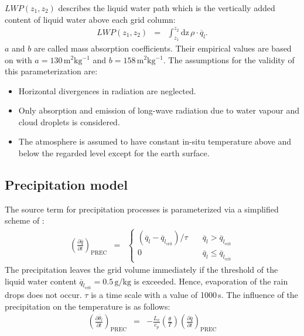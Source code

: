 \documentclass[11pt,a4paper]{scrartcl}
\begin{document}
$LWP(z_{1},z_{2})$ describes the liquid water path which is the vertically added content of liquid water above each grid column: 
\begin{eqnarray}
 LWP(z_{1},z_{2}) & = & \int_{z_{1}}^{z_{2}}\mathrm{dz}\,\rho\cdot\overline q_{l}.
 \label{eq:LWP}
\end{eqnarray}
$a$ and $b$ are called mass absorption coefficients. Their empirical values are based on \linebreak
\cite{stephans78} with $a=130\,\mathrm{m^{2}kg^{-1}}$ and $b=158\,\mathrm{m^{2}kg^{-1}}$.
\newline
The assumptions for the validity of this parameterization are:
\begin{itemize}
 \item Horizontal divergences in radiation are neglected.
 \item Only absorption and emission of long-wave radiation due to water vapour and cloud droplets is considered.
 \item The atmosphere is assumed to have constant in-situ temperature above and below the regarded level except for the earth surface.
\end{itemize}

\subsection{Precipitation model}
The source term for precipitation processes is parameterized via a simplified scheme of \cite{kessler69}:
\begin{eqnarray}
 \left(\frac{\partial \overline q}{\partial t}\right)_{\mathrm{PREC}} & = &
  \begin{cases}
   \left(\overline q_{l}-\overline q_{l_{\mathrm{crit}}}\right)/ \tau & 
   \quad\overline q_{l} > \overline q_{l_{\mathrm{crit}}} \\
   0  & \quad\overline q_{l} \leq \overline q_{l_{\mathrm{crit}}}
  \end{cases}
 \label{precip_term_q}
\end{eqnarray}
The precipitation leaves the grid volume immediately if the threshold of the liquid water content 
$\overline q_{l_{\mathrm{crit}}}=0.5\,\mathrm{g/kg}$ is exceeded. Hence, evaporation of the rain drops does not occur.
$\tau$ is a time scale with a value of 1000\,s.
\newline
The influence of the precipitation on the temperature is as follows:
\begin{eqnarray}
 \left(\frac{\partial \overline\theta_{l}}{\partial t}\right)_{\mathrm{PREC}} & = &
  -\frac{L_{v}}{c_{p}}\left(\frac{\theta}{T}\right)\left(\frac{\partial \overline q}{\partial t}\right)_{\mathrm{PREC}}
 \label{precip_term_pt}
\end{eqnarray}
\end{document}
